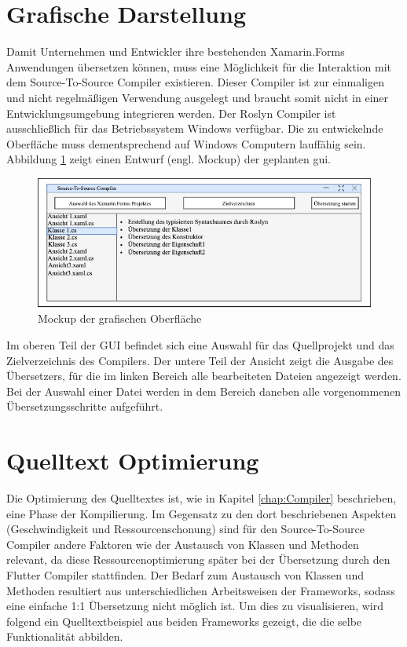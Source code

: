 \section{Grafische Darstellung}
Damit Unternehmen und Entwickler ihre bestehenden Xamarin.Forms Anwendungen übersetzen können, muss eine Möglichkeit für die Interaktion mit dem Source-To-Source Compiler existieren.  Dieser Compiler ist zur einmaligen und nicht regelmäßigen Verwendung ausgelegt und braucht somit nicht in einer Entwicklungsumgebung integrieren werden.  Der Roslyn Compiler ist ausschließlich für das Betriebssystem Windows verfügbar. Die zu entwickelnde Oberfläche muss dementsprechend auf Windows Computern lauffähig sein.  Abbildung \ref{fig:UiMockup} zeigt einen Entwurf (engl. Mockup) der geplanten \ac{gui}.

\begin{figure}[!ht]
 \includegraphics[width=\textwidth,keepaspectratio]{Images/CompilerArchitecture/Mockup.png}
 \caption{Mockup der grafischen Oberfläche}
 \label{fig:UiMockup}
\end{figure}

Im oberen Teil der GUI befindet sich eine Auswahl für das Quellprojekt und das Zielverzeichnis des Compilers.  Der untere Teil der Ansicht zeigt die Ausgabe des Übersetzers,  für die im linken Bereich alle bearbeiteten Dateien angezeigt werden.  Bei der Auswahl einer Datei werden in dem Bereich daneben alle vorgenommenen Übersetzungsschritte aufgeführt.

\section{Quelltext Optimierung}
Die Optimierung des Quelltextes ist, wie in Kapitel \ref{chap:Compiler} beschrieben,  eine Phase der Kompilierung.  Im Gegensatz zu den dort beschriebenen Aspekten (Geschwindigkeit und Ressourcenschonung) sind für den Source-To-Source Compiler andere Faktoren wie der Austausch von Klassen und Methoden relevant,  da diese Ressourcenoptimierung später bei der Übersetzung durch den Flutter Compiler stattfinden.   
Der Bedarf zum Austausch von Klassen und Methoden resultiert aus unterschiedlichen Arbeitsweisen der Frameworks,  sodass eine einfache 1:1 Übersetzung nicht möglich ist.  Um dies zu visualisieren, wird folgend ein Quelltextbeispiel aus beiden Frameworks gezeigt,  die die selbe Funktionalität abbilden.

